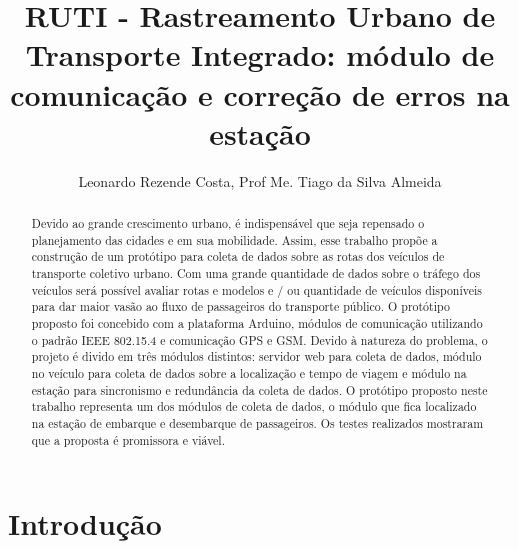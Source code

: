 \documentclass[12pt]{uftpibicsic2018}
\title{RUTI - Rastreamento Urbano de Transporte Integrado: módulo de comunicação e correção de erros na estação}
\author{Leonardo Rezende Costa\inst{1}, Prof Me. Tiago da Silva Almeida\inst{2}}
\begin{document}
\maketitle

\begin{abstract}
Devido ao grande crescimento urbano, é indispensável que seja repensado o planejamento das cidades e em sua mobilidade. Assim, esse trabalho propõe a construção de um protótipo para coleta de dados sobre as rotas dos veículos de transporte coletivo urbano. Com uma grande quantidade de dados sobre o tráfego dos veículos será possível avaliar rotas e modelos e / ou quantidade de veículos disponíveis para dar maior vasão ao fluxo de passageiros do transporte público. O protótipo proposto foi concebido com a plataforma Arduino, módulos de comunicação utilizando o padrão IEEE 802.15.4 e comunicação GPS e GSM. Devido à natureza do problema, o projeto é divido em três módulos distintos: servidor web para coleta de dados, módulo no veículo para coleta de dados sobre a localização e tempo de viagem e módulo na estação para sincronismo e redundância da coleta de dados. O protótipo proposto neste trabalho representa um dos módulos de coleta de dados, o módulo que fica localizado na estação de embarque e desembarque de passageiros. Os testes realizados mostraram que a proposta é promissora e viável.
\end{abstract}

\chapter{Introdução}\vskip -12pt

%
\end{document}
